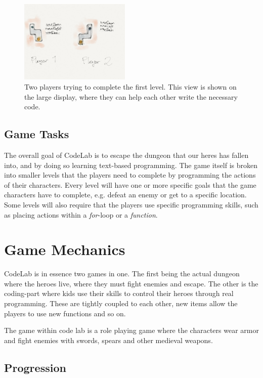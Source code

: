 \documentclass[12pt,journal,compsoc]{IEEEtran}
\begin{document}
\begin{figure}[htb]
    \begin{centering}
    \includegraphics[width=0.47\textwidth]{./figures/codelab5.jpg}
    \caption{Two players trying to complete the first level. This view is shown
    on the large display, where they can help each other write the necessary
    code. } 
    \label{fig:2p}
    \end{centering} 
\end{figure}

\subsection{Game Tasks} 
The overall goal of CodeLab is to escape the dungeon that our heres has fallen
into, and by doing so learning text-based programming. The game itself is broken
into smaller levels that the players need to complete by programming the actions
of their characters. Every level will have one or more specific goals that the
game characters have to complete, e.g. defeat an enemy or get to a specific
location. Some levels will also require that the players use specific
programming skills, such as placing actions within a \emph{for}-loop or a
\emph{function}. 


\section{Game Mechanics} 
CodeLab is in essence two games in one. The first being the actual dungeon where
the heroes live, where they must fight enemies and escape. The other is the
coding-part where kids use their skills to control their heroes through
real programming. These are tightly coupled to each other, new items allow the
players to use new functions and so on. 

The game within code lab is a role playing game where the characters wear armor
and fight enemies with swords, spears and other medieval weapons. 


\subsection{Progression} 
\end{document}
